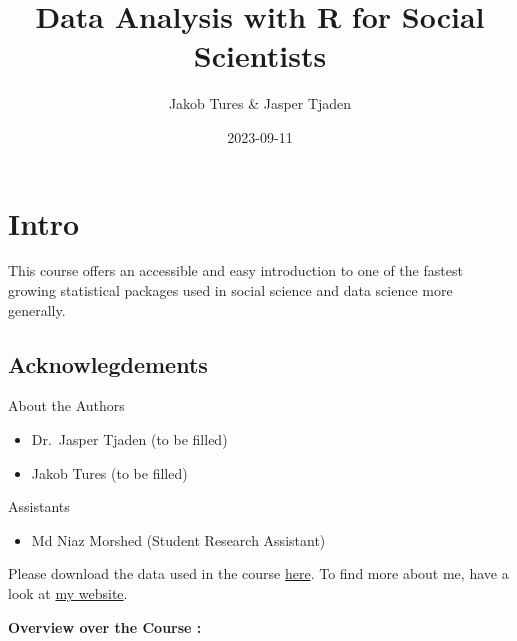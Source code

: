 \documentclass[
]{book}
\title{Data Analysis with R for Social Scientists}
\author{Jakob Tures \& Jasper Tjaden}
\date{2023-09-11}
\providecommand{\tightlist}{%
  \setlength{\itemsep}{0pt}\setlength{\parskip}{0pt}}
\begin{document}
\maketitle

{
\setcounter{tocdepth}{1}
\tableofcontents
}
\hypertarget{intro}{%
\chapter*{Intro}\label{intro}}

This course offers an accessible and easy introduction to one of the fastest growing statistical packages used in social science and data science more generally.

\hypertarget{acknowlegdements}{%
\section{Acknowlegdements}\label{acknowlegdements}}

About the Authors

\begin{itemize}
\item
  Dr.~Jasper Tjaden (to be filled)
\item
  Jakob Tures (to be filled)
\end{itemize}

Assistants

\begin{itemize}
\tightlist
\item
  Md Niaz Morshed (Student Research Assistant)
\end{itemize}

Please download the data used in the course \href{https://www.worldvaluessurvey.org/WVSDocumentationWV7.jsp}{here}. To find more about me, have a look at \href{https://jaspertjaden.com}{my website}.

\textbf{Overview over the Course :}
\end{document}
